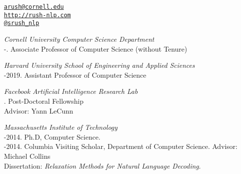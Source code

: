 \documentclass[10pt]{article}
\makeatletter
\def\myemail{arush@cornell.edu}
\def\myweb{http://rush-nlp.com}
\def\myphone{(215) 317-8089}
\def\myfax{srush\_nlp}
\makeatother
\begin{document}
\begin{minipage}[t]{2.95in}

\end{minipage}
\hfill
\hfill
\begin{minipage}[t]{1.7in}
  \flushright %
  {\scriptsize  \texttt{\href{mailto:\myemail}{\myemail}}} \\
  {\scriptsize  \texttt{\href{\myweb}{\myweb}}} \\
  {\scriptsize  \texttt{\href{http://twitter.com/\myfax}{@\myfax}}} \\
\end{minipage}


\medskip

\reversemarginpar
\medskip


\noindent\emph{Cornell University Computer Science Department \vspace{0.01in}}\\
-.  Associate Professor of Computer Science (without Tenure)

\noindent\emph{Harvard University School of Engineering and Applied Sciences \vspace{0.01in}}\\
-2019.  Assistant Professor of Computer Science

\medskip
\noindent\emph{Facebook Artificial Intelligence Research Lab \vspace{0.01in}}\\
.  Post-Doctoral Fellowship\\
\ind Advisor: Yann LeCunn

\bigskip


\noindent\emph{Massachusetts Institute of Technology \vspace{0.01in}}\\
-2014.  Ph.D, Computer Science.\\
-2014. Columbia Visiting Scholar, Department of Computer Science.
\ind Advisor: Michael Collins\\
\ind Dissertation: \emph{Relaxation Methods for Natural Language Decoding}. %
\end{document}
